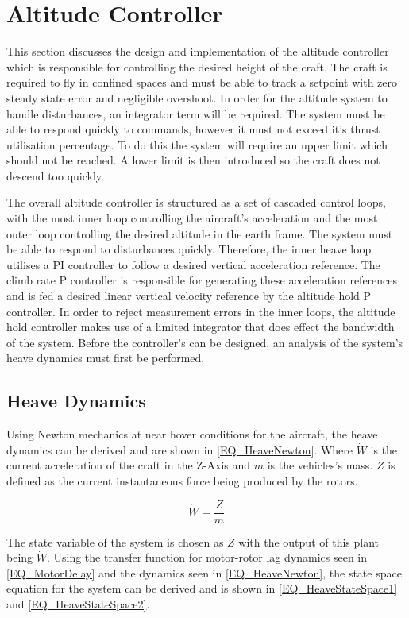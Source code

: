 \section{Altitude Controller}
This section discusses the design and implementation of the altitude controller which is responsible for controlling the desired height of the craft. The craft is required to fly in confined spaces and must be able to track a setpoint with zero steady state error and negligible overshoot. In order for the altitude system to handle disturbances, an integrator term will be required. The system must be able to respond quickly to commands, however it must not exceed it's thrust utilisation percentage. To do this the system will require an upper limit which should not be reached. A lower limit is then introduced so the craft does not descend too quickly.

The overall altitude controller is structured as a set of cascaded control loops, with the most inner loop controlling the aircraft's acceleration and the most outer loop controlling the desired altitude in the earth frame. The system must be able to respond to disturbances quickly. Therefore, the inner heave loop utilises a PI controller to follow a desired vertical acceleration reference. The climb rate P controller is responsible for generating these acceleration references and is fed a desired linear vertical velocity reference by the altitude hold P controller. In order to reject measurement errors in the inner loops, the altitude hold controller makes use of a limited integrator that does effect the bandwidth of the system. Before the controller's can be designed, an analysis of the system's heave dynamics must first be performed.
	 
	 \subsection{Heave Dynamics}
	 Using Newton mechanics at near hover conditions for the aircraft, the heave dynamics can be derived and are shown in \eqref{EQ_HeaveNewton}. Where $\dot{W}$ is the current acceleration of the craft in the Z-Axis and $m$ is the vehicles's mass. $Z$ is defined as the current instantaneous force being produced by the rotors.
	 
	 \begin{equation}
	 \label{EQ_HeaveNewton}
	 \dot{W} = \dfrac{Z}{m}
	 \end{equation}
	 
	 The state variable of the system is chosen as $Z$ with the output of this plant being $\dot{W}$. Using the transfer function for motor-rotor lag dynamics seen in \eqref{EQ_MotorDelay} and the dynamics seen in \eqref{EQ_HeaveNewton}, the state space equation for the system can be derived and is shown in \eqref{EQ_HeaveStateSpace1} and \eqref{EQ_HeaveStateSpace2}. 
	 
